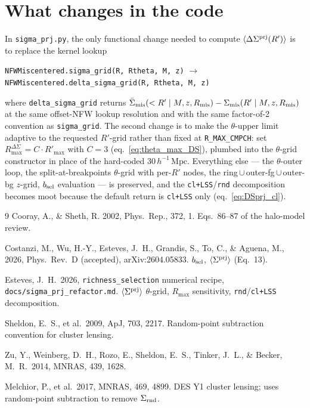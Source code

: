 \documentclass[a4paper, 11pt]{article}
\newcommand{\hMpc}{h^{-1}\,\mathrm{Mpc}}
\newcommand{\bsel}{b_{\rm sel}}
\newcommand{\Sprj}{\Sigma^{\rm prj}}
\newcommand{\Smis}{\Sigma_{\rm mis}}
\newcommand{\DSprj}{\Delta\Sigma^{\rm prj}}
\newcommand{\avg}[1]{\langle #1 \rangle}
\newcommand{\Rmis}{R_{\rm mis}}
\begin{document}
\section{What changes in the code}

In \texttt{sigma\_prj.py}, the only functional change needed to
compute \(\avg{\DSprj(R')}\) is to replace the kernel lookup
\begin{center}
\texttt{NFWMiscentered.sigma\_grid(R, Rtheta, M, z)}
\(\longrightarrow\)
\texttt{NFWMiscentered.delta\_sigma\_grid(R, Rtheta, M, z)}
\end{center}
where \texttt{delta\_sigma\_grid} returns
\(\bar\Sigma_{\rm mis}(<R'\mid M,z,\Rmis)-\Smis(R'\mid M,z,\Rmis)\) at the
same offset-NFW lookup resolution and with the same factor-of-2
convention as \texttt{sigma\_grid}. The second change is to make
the \(\theta\)-upper limit adaptive to the requested \(R'\)-grid
rather than fixed at \texttt{R\_MAX\_CMPCH}: set
\(R_{\max}^{\Delta\Sigma} = C\cdot R'_{\max}\) with \(C\!=\!3\)
(eq.~\ref{eq:theta_max_DS}), plumbed into the \(\theta\)-grid
constructor in place of the hard-coded \(30\,\hMpc\). Everything
else --- the \(\theta\)-outer loop, the split-at-breakpoints
\(\theta\)-grid with per-\(R'\) nodes, the
ring\,\(\cup\)\,outer-fg\,\(\cup\)\,outer-bg \(z\)-grid, \(\bsel\)
evaluation --- is preserved, and the \texttt{cl+LSS}/\texttt{rnd}
decomposition becomes moot because the default return is
\texttt{cl+LSS} only (eq.~\ref{eq:DSprj_cl}).

\begin{thebibliography}{9}
Cooray, A., \& Sheth, R. 2002, Phys.\ Rep., 372, 1.
Eqs.~86--87 of the halo-model review.

Costanzi, M., Wu, H.-Y., Esteves, J.~H., Grandis, S., To, C., \&
Aguena, M., 2026, Phys.~Rev.~D (accepted), arXiv:2604.05833.
\(\bsel\), \(\avg{\Sprj}\) (Eq.~13).

Esteves, J.~H.\ 2026, \texttt{richness\_selection} numerical
recipe, \texttt{docs/sigma\_prj\_refactor.md}. \(\avg{\Sprj}\)
\(\theta\)-grid, \(R_{\max}\) sensitivity, \texttt{rnd}/\texttt{cl+LSS}
decomposition.

Sheldon, E.~S., et al.\ 2009, ApJ, 703, 2217. Random-point
subtraction convention for cluster lensing.

Zu, Y., Weinberg, D.~H., Rozo, E., Sheldon, E.~S., Tinker, J.~L.,
\& Becker, M.~R.\ 2014, MNRAS, 439, 1628.

Melchior, P., et al.\ 2017, MNRAS, 469, 4899. DES Y1 cluster
lensing; uses random-point subtraction to remove \(\Sigma_{\rm rnd}\).
\end{thebibliography}
\end{document}
